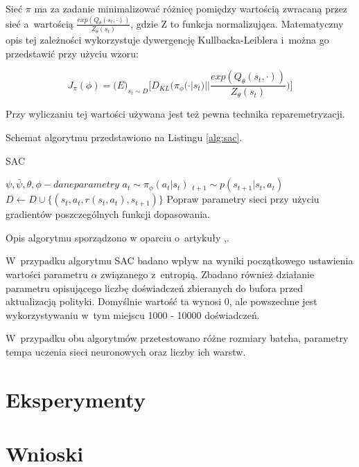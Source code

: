 \documentclass[a4paper,12pt]{article}
\let\oldsection\section
\renewcommand\section{\clearpage\oldsection}
\begin{document}
Sieć $\pi$ ma za zadanie minimalizować różnicę pomiędzy wartością zwracaną przez sieć  a~wartością $\frac{exp(Q_\theta(s_t,\cdot))}{Z_\theta(s_t)}$, gdzie Z to funkcja normalizująca. Matematyczny opis tej zależności wykorzystuje dywergencję Kullbacka-Leiblera i~można go przedstawić przy użyciu wzoru:

\begin{equation}
	J_\pi(\phi) = \mathbb(E)_{s_t \sim D}\Big[ D_{KL} \big(\pi_\phi(\cdot|s_t) || \frac{exp(Q_\theta(s_t,\cdot))}{Z_\theta(s_t)}  \big) \Big]
\end{equation}

Przy wyliczaniu tej wartości używana jest też pewna technika reparemetryzacji.



Schemat algorytmu przedstawiono na Listingu \ref{alg:sac}.
\begin{algorithm}[h!]
	\caption{SAC}
	\label{alg:sac}
	\begin{algorithmic}[1]
		\STATE $\psi, \bar{\psi}, \theta,\phi - dane parametry$
				\STATE $a_t \sim \pi_{\phi}(a_t|s_t)$
				\STATE $_{t+1} \sim p(s_{t+1}|s_t,a_t)$
				\STATE $D \gets D \cup \{(s_t,a_t,r(s_t,a_t),s_{t+1})\}$
			\ENDFOR
		\ENDFOR
		\STATE Popraw parametry sieci przy użyciu gradientów poszczególnych funkcji dopasowania.
	\end{algorithmic}
\end{algorithm}

Opis algorytmu sporządzono w oparciu o~artykuły \cite{kumar},\cite{nieznany}.

W~przypadku algorytmu SAC badano wpływ na wyniki początkowego ustawienia wartości parametru $\alpha$ związanego z~entropią. Zbadano również działanie parametru opisującego liczbę doświadczeń zbieranych do bufora przed aktualizacją polityki. Domyślnie wartość ta wynosi 0, ale powszechne jest wykorzystywaniu w~tym miejscu 1000 - 10000 doświadczeń.

W~przypadku obu algorytmów przetestowano różne rozmiary batcha, parametry tempa uczenia sieci neuronowych oraz liczby ich warstw.

\section{Eksperymenty}


\section{Wnioski}
\end{document}

